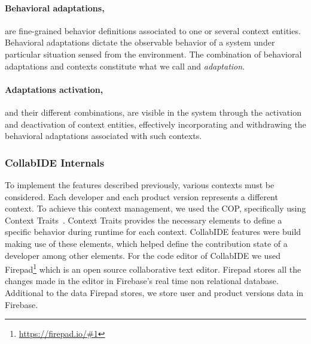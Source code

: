 \paragraph{Behavioral adaptations,} are fine-grained behavior definitions associated to one or several context entities. Behavioral adaptations dictate the observable behavior of a system under particular situation sensed from the environment. The combination of behavioral adaptations and contexts constitute what we call and \emph{adaptation}.

\paragraph{Adaptations activation,} and their different combinations, are visible in the system through the activation and deactivation of context entities, effectively incorporating and withdrawing the behavioral adaptations associated with such contexts.


\subsubsection{CollabIDE Internals}
To implement the features described previously, various contexts must be considered. Each developer 
and each product version represents a different context. To achieve this context management, we used 
the \ac{COP}, specifically using Context Traits~\cite{gonzalez13}. 
Context Traits provides the necessary elements to define a specific behavior during runtime for each 
context. CollabIDE features were build making use of these elements, which helped define the 
contribution state of a developer among other elements.
For the code editor of CollabIDE we used Firepad\footnote{\url{https://firepad.io/\#1}} which is an open 
source collaborative text editor. Firepad stores all the changes made in the editor in Firebase’s real 
time non relational database. Additional to the data Firepad stores, we store user and product versions 
data in Firebase.

\endinput
